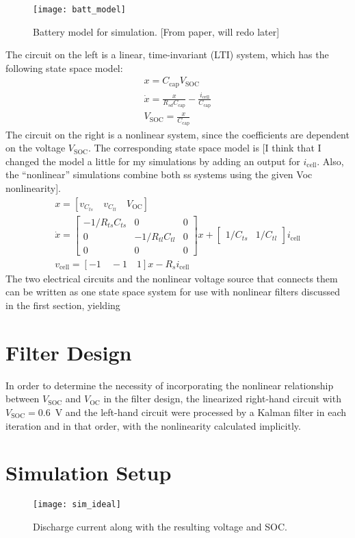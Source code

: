 \begin{figure}[ht]
\centering
\texttt{[image: batt\_model]}
\caption{Battery model for simulation. [From paper, will redo later]}
\label{fig:batt_model}
\end{figure}

The circuit on the left is a linear, time-invariant (LTI) system, which has the following state space model:
\begin{gather}
    x = C_\text{cap} V_\text{SOC} \\
    \dot{x} = \frac{x}{R_{sd} C_\text{cap}} - \frac{i_\text{cell}}{C_\text{cap}} \\
    V_\text{SOC} = \frac{x}{C_\text{cap}}
\end{gather}
The circuit on the right is a nonlinear system, since the coefficients are dependent on the voltage $V_\text{SOC}$. The corresponding state space model is [I think that I changed the model a little for my simulations by adding an output for $i_\text{cell}$. Also, the ``nonlinear'' simulations combine both ss systems using the given Voc nonlinearity].
\begin{gather}
    x = [v_{C_{ts}} \quad v_{C_{tl}} \quad V_\text{OC}] \\
	\dot{x} = \begin{bmatrix}
		-1/R_{ts}C_{ts} & 0 & 0 \\
		0 & -1/R_{tl}C_{tl} & 0 \\
		0 & 0 & 0
		\end{bmatrix} x 
		+ \begin{bmatrix} 1/C_{ts} & 1/C_{tl} \end{bmatrix} i_\text{cell} \\
	v_\text{cell} = [-1 \quad -1 \quad 1] x - R_s i_\text{cell}
\end{gather}
The two electrical circuits and the nonlinear voltage source that connects them can be written as one state space system for use with nonlinear filters discussed in the first section, yielding

\section{Filter Design}

In order to determine the necessity of incorporating the nonlinear relationship between $V_\text{SOC}$ and $V_\text{OC}$ in the filter design, the linearized right-hand circuit with $V_\text{SOC}=0.6$~V and the left-hand circuit were processed by a Kalman filter in each iteration and in that order, with the nonlinearity calculated implicitly.

\section{Simulation Setup}

\begin{figure}
\centering
\texttt{[image: sim\_ideal]}
\caption{Discharge current along with the resulting voltage and SOC.}
\label{fig:idealsim}
\end{figure}
